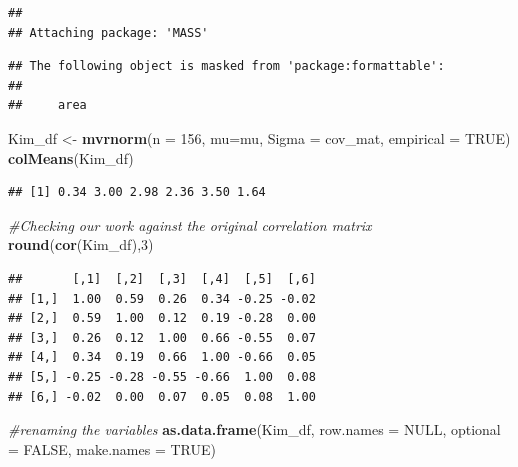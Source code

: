 \documentclass[
  11pt,
]{book}
\newenvironment{Shaded}{\begin{snugshade}}{\end{snugshade}}
\newcommand{\AttributeTok}[1]{\textcolor[rgb]{0.27,0.27,0.27}{#1}}
\newcommand{\CommentTok}[1]{\textcolor[rgb]{0.37,0.37,0.37}{\textit{#1}}}
\newcommand{\ConstantTok}[1]{\textcolor[rgb]{0.37,0.37,0.37}{#1}}
\newcommand{\DecValTok}[1]{\textcolor[rgb]{0.06,0.06,0.06}{#1}}
\newcommand{\FunctionTok}[1]{\textcolor[rgb]{0.27,0.27,0.27}{\textbf{#1}}}
\newcommand{\NormalTok}[1]{#1}
\newcommand{\OtherTok}[1]{\textcolor[rgb]{0.37,0.37,0.37}{#1}}
\begin{document}
\begin{verbatim}
## 
## Attaching package: 'MASS'
\end{verbatim}

\begin{verbatim}
## The following object is masked from 'package:formattable':
## 
##     area
\end{verbatim}

\begin{Shaded}
\begin{Highlighting}[]
\NormalTok{Kim\_df }\OtherTok{\textless{}{-}} \FunctionTok{mvrnorm}\NormalTok{(}\AttributeTok{n =} \DecValTok{156}\NormalTok{, }\AttributeTok{mu=}\NormalTok{mu, }\AttributeTok{Sigma =}\NormalTok{ cov\_mat, }\AttributeTok{empirical =} \ConstantTok{TRUE}\NormalTok{)}
\FunctionTok{colMeans}\NormalTok{(Kim\_df)}
\end{Highlighting}
\end{Shaded}

\begin{verbatim}
## [1] 0.34 3.00 2.98 2.36 3.50 1.64
\end{verbatim}

\begin{Shaded}
\begin{Highlighting}[]
\CommentTok{\#Checking our work against the original correlation matrix}
\FunctionTok{round}\NormalTok{(}\FunctionTok{cor}\NormalTok{(Kim\_df),}\DecValTok{3}\NormalTok{)}
\end{Highlighting}
\end{Shaded}

\begin{verbatim}
##       [,1]  [,2]  [,3]  [,4]  [,5]  [,6]
## [1,]  1.00  0.59  0.26  0.34 -0.25 -0.02
## [2,]  0.59  1.00  0.12  0.19 -0.28  0.00
## [3,]  0.26  0.12  1.00  0.66 -0.55  0.07
## [4,]  0.34  0.19  0.66  1.00 -0.66  0.05
## [5,] -0.25 -0.28 -0.55 -0.66  1.00  0.08
## [6,] -0.02  0.00  0.07  0.05  0.08  1.00
\end{verbatim}

\begin{Shaded}
\begin{Highlighting}[]
\CommentTok{\#renaming the variables}
\FunctionTok{as.data.frame}\NormalTok{(Kim\_df, }\AttributeTok{row.names =} \ConstantTok{NULL}\NormalTok{, }\AttributeTok{optional =} \ConstantTok{FALSE}\NormalTok{, }\AttributeTok{make.names =} \ConstantTok{TRUE}\NormalTok{)}
\end{Highlighting}
\end{Shaded}
\end{document}
